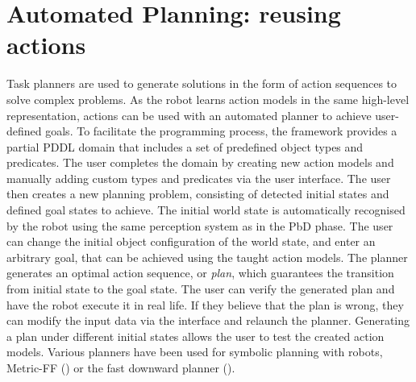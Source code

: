 \section{Automated Planning: reusing actions}\label{sec:AP}
Task planners are used to generate solutions in the form of action sequences to solve complex problems.
As the robot learns action models in the same high-level representation, actions can be used with an automated planner to achieve user-defined goals. 
To facilitate the programming process, the framework provides a partial PDDL domain that includes a set of predefined object types and predicates.
The user completes the domain by creating new action models and manually adding custom types and predicates via the user interface.	
The user then creates a new planning problem, consisting of detected initial states and defined goal states to achieve.
The initial world state is automatically recognised by the robot using the same perception system as in the PbD phase. 
The user can change the initial object configuration of the world state, and enter an arbitrary goal, that can be achieved using the taught action models.
The planner generates an optimal action sequence, or \textit{plan}, which guarantees the transition from initial state to the goal state. 
The user can verify the generated plan and have the robot execute it in real life.
If they believe that the plan is wrong, they can modify the input data via the interface and relaunch the planner.
Generating a plan under different initial states allows the user to test the created action models.
Various planners have been used for symbolic planning with robots, \eg Metric-FF (\cite{cubek2015high}) or the fast downward planner (\cite{abdo2013learning}). 


